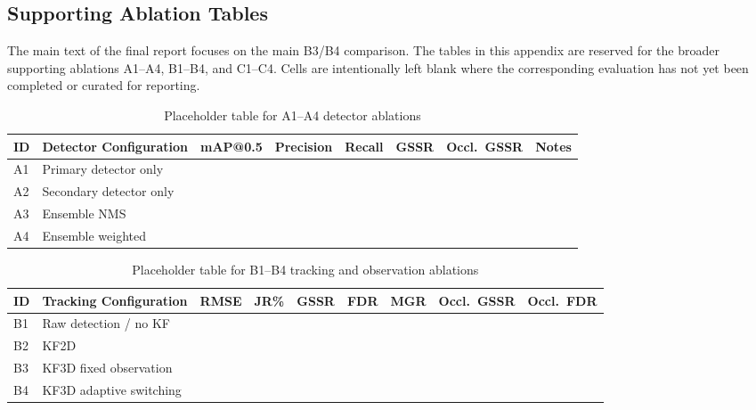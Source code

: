 \documentclass[pdflatex,sn-mathphys-num]{sn-jnl}%
\theoremstyle{thmstyleone}%
\theoremstyle{thmstyletwo}%
\theoremstyle{thmstylethree}%
\begin{document}
\iffalse
\begin{appendices}

\section{Supporting Ablation Tables}
\label{app:ablation_tables}

The main text of the final report focuses on the main B3/B4
comparison. The tables in this appendix are reserved for the broader
supporting ablations A1--A4, B1--B4, and C1--C4. Cells are intentionally
left blank where the corresponding evaluation has not yet been completed or
curated for reporting.

\begin{table}[h]
\centering
\caption{Placeholder table for A1--A4 detector ablations}
\label{tab:appendix_a_ablation}
\begin{tabular}{llcccccc}
\hline
\textbf{ID} & \textbf{Detector Configuration}
  & \textbf{mAP@0.5}
  & \textbf{Precision}
  & \textbf{Recall}
  & \textbf{GSSR}
  & \textbf{Occl.\ GSSR}
  & \textbf{Notes} \\
\hline
A1 & Primary detector only            &  &  &  &  &  &  \\
A2 & Secondary detector only          &  &  &  &  &  &  \\
A3 & Ensemble NMS                     &  &  &  &  &  &  \\
A4 & Ensemble weighted                &  &  &  &  &  &  \\
\hline
\end{tabular}
\end{table}

\begin{table}[h]
\centering
\caption{Placeholder table for B1--B4 tracking and observation ablations}
\label{tab:appendix_b_ablation}
\begin{tabular}{llccccccc}
\hline
\textbf{ID} & \textbf{Tracking Configuration}
  & \textbf{RMSE}
  & \textbf{JR\%}
  & \textbf{GSSR}
  & \textbf{FDR}
  & \textbf{MGR}
  & \textbf{Occl.\ GSSR}
  & \textbf{Occl.\ FDR} \\
\hline
B1 & Raw detection / no KF                    &  &  &  &  &  &  &  \\
B2 & KF2D                                     &  &  &  &  &  &  &  \\
B3 & KF3D fixed observation                   &  &  &  &  &  &  &  \\
B4 & KF3D adaptive switching                  &  &  &  &  &  &  &  \\
\hline
\end{tabular}
\end{table}


\end{appendices}
\end{document}
